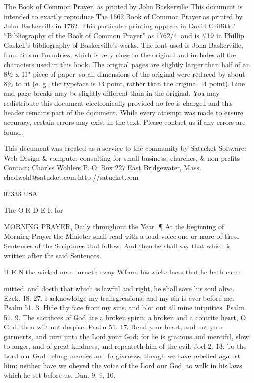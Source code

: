 
The Book of Common Prayer, as printed by John Baskerville This document is intended to exactly reproduce The 1662 Book of Common Prayer as printed by John Baskerville in 1762. This particular printing appears in David Griffiths' “Bibliography of the Book of Common Prayer” as 1762/4; and is \#19 in Phillip Gaskell's bibliography of Baskerville's works. The font used is John Baskerville, from Storm Foundries, which is very close to the original and includes all the characters used in this book. The original pages are slightly larger than half of an 8½ x 11" piece of paper, so all dimensions of the original were reduced by about 8\% to fit (e. g., the typeface is 13 point, rather than the original 14 point). Line and page breaks may be slightly different than in the original. You may redistribute this document electronically provided no fee is charged and this header remains part of the document. While every attempt was made to ensure accuracy, certain errors may exist in the text. Please contact us if any errors are found.

This document was created as a service to the community by Satucket Software: Web Design \& computer consulting for small business, churches, \& non-profits Contact: Charles Wohlers P. O. Box 227 East Bridgewater, Mass. chadwohl@satucket.com http://satucket.com

02333 USA

The O R D E R for

MORNING PRAYER, Daily throughout the Year. ¶ At the beginning of Morning Prayer the Minicter shall read with a loud voice one or more of these Sentences of the Scriptures that follow. And then he shall say that which is written after the said Sentences.

H E N the wicked man turneth away Wfrom his wickedness that he hath com-

mitted, and doeth that which is lawful and right, he shall save his soul alive. Ezek. 18. 27. I acknowledge my transgressions; and my sin is ever before me. Psalm 51. 3. Hide thy face from my sins, and blot out all mine iniquities. Psalm 51. 9. The sacrifices of God are a broken spirit: a broken and a contrite heart, O God, thou wilt not despise. Psalm 51. 17. Rend your heart, and not your garments, and turn unto the Lord your God: for he is gracious and merciful, slow to anger, and of great kindness, and repenteth him of the evil. Joel 2. 13. To the Lord our God belong mercies and forgiveness, though we have rebelled against him: neither have we obeyed the voice of the Lord our God, to walk in his laws which he set before us. Dan. 9. 9, 10.

